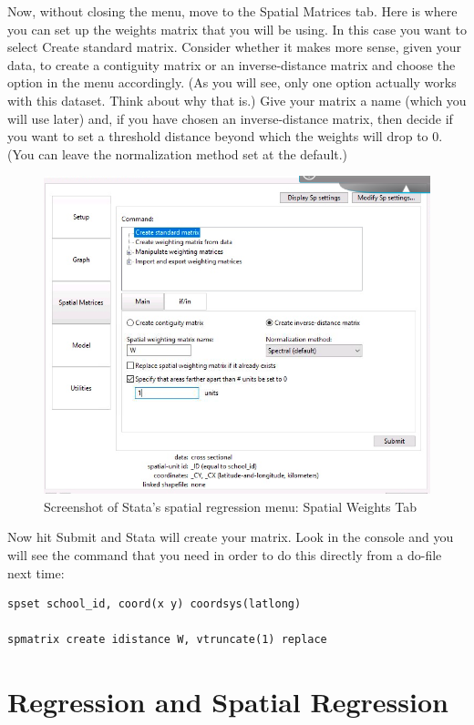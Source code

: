 \documentclass[]{book}
\begin{document}
Now, without closing the menu, move to the Spatial Matrices tab. Here is where you can set up the weights matrix that you will be using. In this case you want to select Create standard matrix. Consider whether it makes more sense, given your data, to create a contiguity matrix or an inverse-distance matrix and choose the option in the menu accordingly. (As you will see, only one option actually works with this dataset. Think about why that is.) Give your matrix a name (which you will use later) and, if you have chosen an inverse-distance matrix, then decide if you want to set a threshold distance beyond which the weights will drop to 0. (You can leave the normalization method set at the default.)

\begin{figure}
\centering
\includegraphics{images/stata_spatial_weights_menu.png}
\caption{Screenshot of Stata's spatial regression menu: Spatial Weights Tab}
\end{figure}

Now hit Submit and Stata will create your matrix. Look in the console and you will see the command that you need in order to do this directly from a do-file next time:

\begin{verbatim}
spset school_id, coord(x y) coordsys(latlong)
 
spmatrix create idistance W, vtruncate(1) replace
\end{verbatim}

\hypertarget{regression-and-spatial-regression}{%
\section{Regression and Spatial Regression}\label{regression-and-spatial-regression}}
\end{document}
